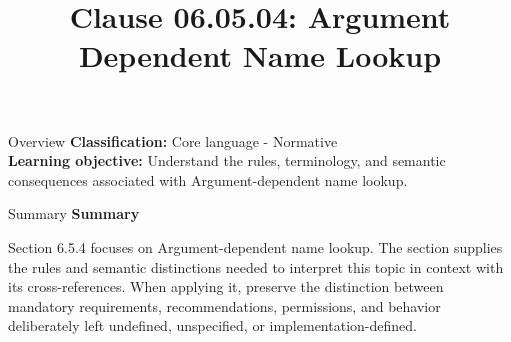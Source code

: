 \documentclass[10pt,letterpaper]{article}
\title{Clause 06.05.04: Argument Dependent Name Lookup}
\author{}
\date{}
\begin{document}
\maketitle
\begin{CornellOverviewBox}{Overview}
\textbf{Classification:} Core language - Normative\\[2pt]
\textbf{Learning objective:} Understand the rules, terminology, and semantic consequences associated with Argument-dependent name lookup.
\end{CornellOverviewBox}\begin{CornellSummaryBox}{Summary}
{\sffamily\bfseries\color{Accent} Summary}\par\vspace{3pt}Section 6.5.4 focuses on Argument-dependent name lookup. The section supplies the rules and semantic distinctions needed to interpret this topic in context with its cross-references. When applying it, preserve the distinction between mandatory requirements, recommendations, permissions, and behavior deliberately left undefined, unspecified, or implementation-defined.
\end{CornellSummaryBox}
\end{document}
